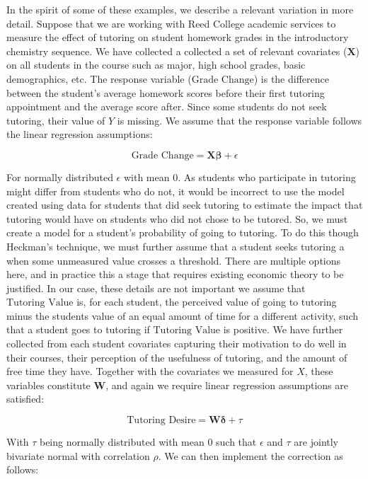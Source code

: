 \documentclass[12pt,twoside]{reedthesis}
\theoremstyle{definition}
\begin{document}
In the spirit of some of these examples, we describe a relevant variation in more detail. Suppose that we are working with Reed College academic services to measure the effect of tutoring on student homework grades in the introductory chemistry sequence. We have collected a collected a set of relevant covariates ($\mathbf{X}$) on all students in the course such as major, high school grades, basic demographics, etc. The response variable ($\text{Grade Change}$) is the difference between the student's average homework scores before their first tutoring appointment and the average score after. Since some students do not seek tutoring, their value of $Y$ is missing. We assume that the response variable follows the linear regression assumptions:

$$\text{Grade Change} =   \mathbf{X}\boldsymbol{\beta} + \epsilon$$

For normally distributed $\epsilon$ with mean $0$. As students who participate in tutoring might differ from students who do not, it would be incorrect to use the model created using data for students that did seek tutoring to estimate the impact that tutoring would have on students who did not chose to be tutored. So, we must create a model for a student's probability of going to tutoring. To do this though Heckman's technique, we must further assume that a student seeks tutoring a when some unmeasured value crosses a threshold. There are multiple options here, and in practice this a stage that requires existing economic theory to be justified. In our case, these details are not important we assume that $\text{Tutoring Value}$ is, for each student, the perceived value of going to tutoring minus the students value of an equal amount of time for a different activity, such that a student goes to tutoring if  $\text{Tutoring Value}$ is positive. We have further collected from each student covariates capturing their motivation to do well in their courses, their perception of the usefulness of tutoring, and the amount of free time they have. Together with the covariates we measured for $X$, these variables constitute $\mathbf{\mathbf{W}}$,  and again we require linear regression assumptions are satisfied:

$$\text{Tutoring Desire} = \mathbf{W}  \boldsymbol{\delta} + \tau$$

With $\tau$ being normally distributed with mean $0$ such that $\epsilon$ and $\tau$ are jointly bivariate normal with correlation $\rho$. We can then implement the correction as follows:
\end{document}
